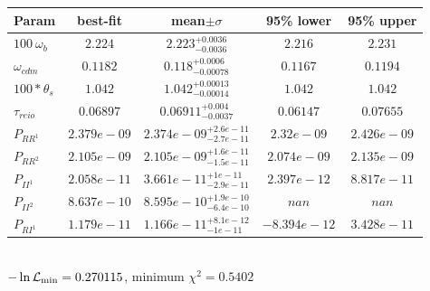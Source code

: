\begin{tabular}{|l|c|c|c|c|} 
 \hline 
Param & best-fit & mean$\pm\sigma$ & 95\% lower & 95\% upper \\ \hline 
$100~\omega_{b }$ &$2.224$ & $2.223_{-0.0036}^{+0.0036}$ & $2.216$ & $2.231$ \\ 
$\omega_{cdm }$ &$0.1182$ & $0.118_{-0.00078}^{+0.0006}$ & $0.1167$ & $0.1194$ \\ 
$100*\theta_{s }$ &$1.042$ & $1.042_{-0.00014}^{+0.00013}$ & $1.042$ & $1.042$ \\ 
$\tau_{reio }$ &$0.06897$ & $0.06911_{-0.0037}^{+0.004}$ & $0.06147$ & $0.07655$ \\ 
$P_{{RR}^1 }$ &$2.379e-09$ & $2.374e-09_{-2.7e-11}^{+2.6e-11}$ & $2.32e-09$ & $2.426e-09$ \\ 
$P_{{RR}^2 }$ &$2.105e-09$ & $2.105e-09_{-1.5e-11}^{+1.6e-11}$ & $2.074e-09$ & $2.135e-09$ \\ 
$P_{{II}^1 }$ &$2.058e-11$ & $3.661e-11_{-2.9e-11}^{+1e-11}$ & $2.397e-12$ & $8.817e-11$ \\ 
$P_{{II}^2 }$ &$8.637e-10$ & $8.595e-10_{-6.4e-10}^{+1.9e-10}$ & $nan$ & $nan$ \\ 
$P_{{RI}^1 }$ &$1.179e-11$ & $1.166e-11_{-1e-11}^{+8.1e-12}$ & $-8.394e-12$ & $3.428e-11$ \\ 
\hline 
 \end{tabular} \\ 
$-\ln{\cal L}_\mathrm{min} =0.270115$, minimum $\chi^2=0.5402$ \\ 
